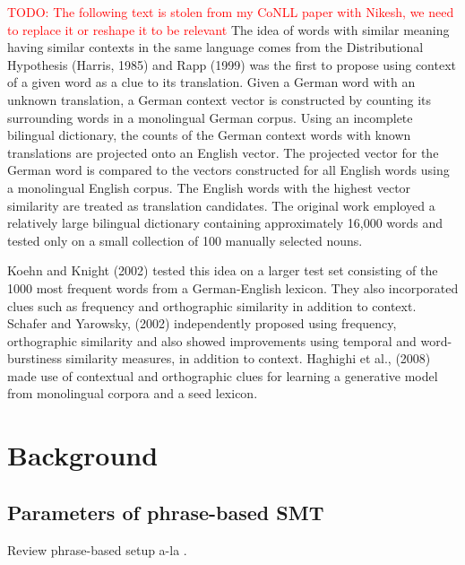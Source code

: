 \documentclass[11pt]{article}
\newcommand{\todo}[1]{\textcolor{red}{TODO: #1}}
\begin{document}
\todo{The following text is stolen from my CoNLL paper with Nikesh, we need to replace it or reshape it to be relevant}
The idea of words with similar meaning having similar contexts in the same language comes from the Distributional Hypothesis (Harris, 1985) and Rapp (1999) was the first to propose using context of a given word as a clue to its translation. Given a German word with an unknown translation, a German context vector is constructed by counting its surrounding words in a monolingual German corpus.  Using an incomplete bilingual dictionary, the counts of the German context words with known translations are projected onto an English vector.  The projected vector for the German word is compared to the vectors constructed for all English words using a monolingual English corpus.  The English words with the highest vector similarity are treated as translation candidates.  The original work employed a relatively large bilingual dictionary containing approximately 16,000 words and tested only on a small collection of 100 manually selected nouns.

Koehn and Knight (2002) tested this idea on a larger test set consisting of the 1000 most frequent words from a German-English lexicon. They also incorporated clues such as frequency and orthographic similarity in addition to context. Schafer and Yarowsky, (2002) independently proposed using frequency, orthographic similarity and also showed improvements using temporal and word-burstiness similarity measures, in addition to context. Haghighi et al., (2008) made use of contextual and orthographic clues for learning a generative model from monolingual corpora and a seed lexicon.




\section{Background} \label{sect:bckg}
\subsection{Parameters of phrase-based SMT} \label{sect:bckg:smt}

Review phrase-based setup a-la \cite{Koehn:2003}.
\end{document}
